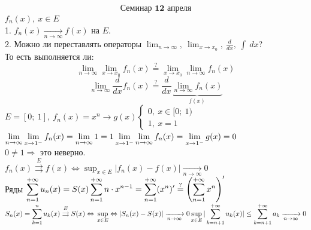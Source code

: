 \documentclass[12pt, letterpaper, twoside]{article}
\newcommand{\DS}{\displaystyle}
\newcommand{\oo}{\infty}
\begin{document}
    \[\textbf{Семинар 12 апреля} \]
    $f_n(x),\ x\in E$\\
    1. $f_n(x) \xrightarrow[n\rightarrow \infty]{} f(x)$ на $E$.\\
    2. Можно ли переставлять операторы $\DS \lim_{n\rightarrow \infty},\ \lim_{x\rightarrow x_0},\ \frac{d}{dx},\ \int\ dx$?\\
    То есть выполняется ли:
    \[\lim_{n\rightarrow \infty} \lim_{x\rightarrow x_0} f_n(x) \overset{?}{=} \lim_{x\rightarrow x_0}\lim_{n\rightarrow \oo} f_n(x)\]
    \[\lim_{n\rightarrow \oo} \frac{d}{dx} f_n(x) \overset{?}{=} \frac{d}{dx} \underset{f(x)}{\underbrace{\lim_{n\rightarrow \oo} f_n(x)}}\]
    $E = [0;\ 1],\ f_n(x) = x^n \longrightarrow g(x) \begin{cases}
        0,\ x\in [0;\ 1)\\
        1,\ x = 1
    \end{cases}$\\
    $\DS \lim_{n\rightarrow \oo}\lim_{x\rightarrow 1^-} f_n(x) = \lim_{n\rightarrow \oo} 1 = 1\\
    \lim_{x\rightarrow 1^-}\lim_{n\rightarrow \oo} f_n(x) = \lim_{x\rightarrow 1^-} g(x) = 0$\\
    $0\neq 1\Rightarrow$ это неверно.\\
    $f_n(x) \overset{E}{\rightrightarrows} f(x) \Leftrightarrow \DS \sup_{x\in E} |f_n(x) - f(x)|\xrightarrow[n\rightarrow \oo]{} 0$\\
    Ряды $\DS \sum_{n = 1}^{+\oo} u_n(x) = S(x)\\
    \sum_{n = 1}^{+\oo} n\cdot x^{n - 1} = \sum^{+\oo}_{n = 1} (x^n)' \overset{?}{=} \left(\sum_{n = 1}^{+\oo} x^n\right)'$\\
    $S_n(x) = \DS\sum_{k = 1}^{n} u_k(x) \overset{E}{\rightrightarrows} S(x)\Leftrightarrow\\
    \sup_{x\in E}\Leftrightarrow |S_n(x) - S(x)| \xrightarrow[n\rightarrow\oo]{}0\\
    \sup_{x\in E} |\sum_{k = n+1}^{+\oo} u_k(x)|\leq \sum_{k = n+ 1}^{+\oo} a_k\xrightarrow[n\rightarrow \oo]{}0$\\
\end{document}

